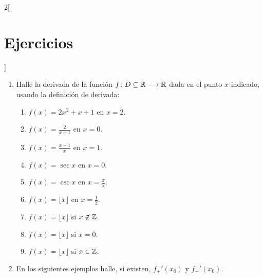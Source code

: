 \begin{multicols}{2}[\section{Ejercicios}]
\begingroup
\small
\begin{enumerate}[leftmargin=*]
\item Halle la derivada de la función $f\colon D\subseteq \mathbb{R}\longrightarrow \mathbb{R}$ dada en el punto $x$
    indicado, usando la definición de derivada:
        \begin{enumerate}[leftmargin=*]
        \item $f(x)= 2x^2+x+1$ en $x=2$.
        \item $f(x) = \frac{2}{x+1}$ en $x=0$.
        \item $f(x)= \frac{x-1}{x}$ en $x=1$.
        \item $f(x) = \sec x$ en $x = 0$.
        \item $f(x) = \csc x$ en $\displaystyle x = \frac{\pi}{2}$.
        \item $f(x) = \lfloor x \rfloor$ en $\displaystyle x = \frac{1}{2}$.
        \item $f(x) = \lfloor x \rfloor$ si $x \not\in\mathbb{Z}$.
        \item $f(x) = \lfloor x \rfloor$ si $x = 0$.
        \item $f(x) = \lfloor x \rfloor$ si $x \in\mathbb{Z}$.
        \end{enumerate}
\item En los siguientes ejemplos halle, si existen, $f_+'(x_0)$ y $f_-'(x_0)$.
\end{enumerate}
\end{multicols}
